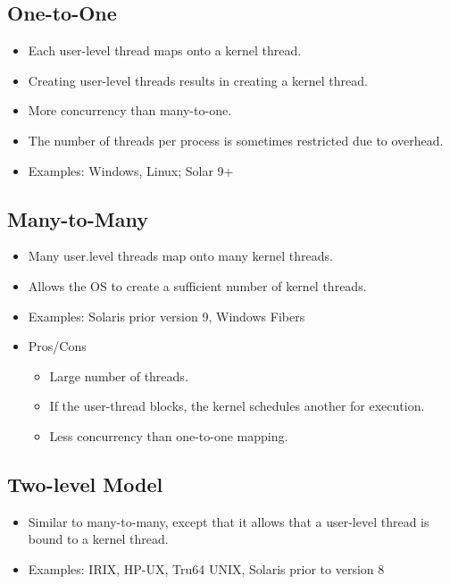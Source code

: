 \documentclass[a4paper, 11pt, accentcolor = tud3b]{tudreport}
\providecommand{\pro}{\item[+]}
\providecommand{\con}{\item[- ]}
\begin{document}
            \subsection{One-to-One}
                \begin{itemize}
                	\item Each user-level thread maps onto a kernel thread.
                	\item Creating user-level threads results in creating a kernel thread.
                	\item More concurrency than many-to-one.
                	\item The number of threads per process is sometimes restricted due to overhead.
                	\item Examples: Windows, Linux; Solar 9+
                \end{itemize}

            \subsection{Many-to-Many}
                \begin{itemize}
                	\item Many user.level threads map onto many kernel threads.
                	\item Allows the OS to create a sufficient number of kernel threads.
                	\item Examples: Solaris prior version 9, Windows Fibers
                	\item Pros/Cons
	                	\begin{itemize}
	                		\pro Large number of threads.
	                		\pro If the user-thread blocks, the kernel schedules another for execution.
	                		\con Less concurrency than one-to-one mapping.
	                	\end{itemize}
                \end{itemize}

            \subsection{Two-level Model}
                \begin{itemize}
                	\item Similar to many-to-many, except that it allows that a user-level thread is bound to a kernel thread.
                	\item Examples: IRIX, HP-UX, Tru64 UNIX, Solaris prior to version 8
                \end{itemize}
\end{document}
